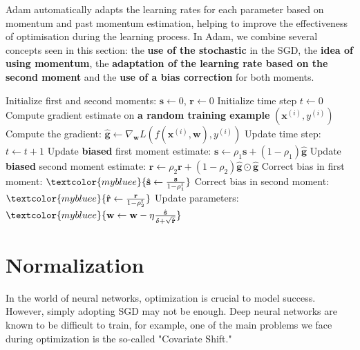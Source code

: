 Adam automatically adapts the learning rates for each parameter based on momentum and past momentum estimation, helping to improve the effectiveness of optimisation during the learning process. In Adam, we combine several concepts seen in this section: the \textbf{use of the stochastic} in the SGD, the \textbf{idea of using momentum}, the \textbf{adaptation of the learning rate based on the second moment} and the \textbf{use of a bias correction} for both moments.
\newpage
\begin{algorithm}
\renewcommand\thealgorithm{}
\caption{\textbf{\textcolor{mygreen}{Adam}}}
\begin{algorithmic}[1]
\STATE Initialize first and second moments: $\mathbf{s} \leftarrow 0$, $\mathbf{r} \leftarrow 0$
\STATE Initialize time step $t \leftarrow 0$
\STATE Compute gradient estimate on \textbf{\textcolor{myred}{a random training example}} $(\mathbf{x}^{(i)}, y^{(i)})$
\STATE Compute the gradient: $\mathbf{\hat{g}} \leftarrow \nabla_{\mathbf{w}} L(f(\mathbf{x}^{(i)},\mathbf{w}), y^{(i)})$
\STATE Update time step: $t \leftarrow t + 1$
\STATE Update \textbf{biased} first moment estimate:
$\mathbf{s} \leftarrow \rho_1 \mathbf{s} + (1 - \rho_1) \mathbf{\hat{g}}$ \qquad \quad \qquad \COMMENT{\textbf{\textcolor{gray!90!white}{Momentum Idea}}}
\STATE Update \textbf{biased} second moment estimate:
$\mathbf{r} \leftarrow \rho_2 \mathbf{r} + (1 - \rho_2) \mathbf{\hat{g}} \odot \mathbf{\hat{g}}$ \qquad \COMMENT{\textbf{\textcolor{gray!90!white}{RMSProp Idea}}}
\STATE Correct bias in first moment: $\textcolor{mybluee}{\hat{\mathbf{s}} \leftarrow \frac{\mathbf{s}}{1 - \rho_1^t}}$
\STATE Correct bias in second moment: $\textcolor{mybluee}{\hat{\mathbf{r}} \leftarrow \frac{\mathbf{r}}{1 - \rho_2^t}}$
\STATE Update parameters:
$\textcolor{mybluee}{\mathbf{w} \leftarrow \mathbf{w} - \eta \frac{\hat{\mathbf{s}}}{\delta + \sqrt{\hat{\mathbf{r}}}}}$
\ENDWHILE
\end{algorithmic}
\end{algorithm}

\vspace{-0.5cm}
\section{Normalization}

\vspace{-0.4cm}
In the world of neural networks, optimization is crucial to model success. However, simply adopting SGD may not be enough. Deep neural networks are known to be difficult to train, for example, one of the main problems we face during optimization is the so-called "Covariate Shift."
\vspace{-0.4cm}

